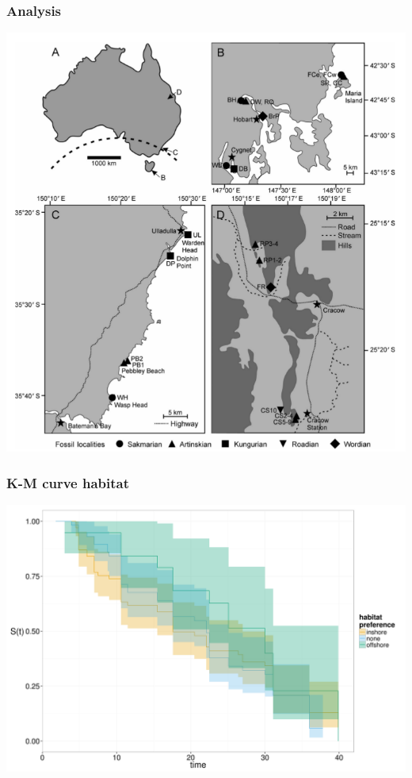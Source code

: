 \documentclass{beamer}
\begin{document}
\begin{frame}
  \frametitle{Analysis}
  \begin{center}
    \includegraphics[height = 0.8\textheight, width = \textwidth, keepaspectratio = true]{figure/australia}

    \tiny{}
  \end{center}
\end{frame}

\begin{frame}
  \frametitle{K-M curve habitat}
  \begin{center}
    \includegraphics[height = 0.8\textheight, width = \textwidth, keepaspectratio = true]{figure/km_hab}
  \end{center}
\end{frame}
\end{document}
